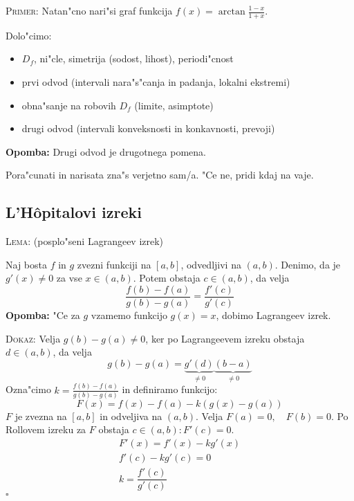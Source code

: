 \textsc{Primer:} Natan"cno nari"si graf funkcija $f(x) = \arctan \frac{1 - x}{1 + x}$.

Dolo"cimo:
\begin{itemize}
	\item $D_f$, ni"cle, simetrija (sodost, lihost), periodi"cnost
	\item prvi odvod (intervali nara"s"canja in padanja, lokalni ekstremi)
	\item obna"sanje na robovih $D_f$ (limite, asimptote)
	\item drugi odvod (intervali konveksnosti in konkavnosti, prevoji)
\end{itemize}
\textbf{Opomba:} Drugi odvod je drugotnega pomena.

Pora"cunati in narisata zna"s verjetno sam/a. "Ce ne, pridi kdaj na vaje.
%
\subsection{L'H\^{o}pitalovi izreki}
\textsc{Lema:} (posplo"seni Lagrangeev izrek)

Naj bosta $f$ in $g$ zvezni funkciji na $[a, b]$, odvedljivi na $(a, b)$. Denimo, da je $g'(x) \neq 0$ za vse $x \in (a, b)$. Potem obstaja $c \in (a, b)$, da velja
\begin{equation*}
\dfrac{f(b) - f(a)}{g(b) - g(a)} = \dfrac{f'(c)}{g'(c)}
\end{equation*}
\textbf{Opomba:} "Ce za $g$ vzamemo funkcijo $g(x) = x$, dobimo Lagrangeev izrek.

\textsc{Dokaz:} Velja $g(b) - g(a) \neq 0$, ker po Lagrangeevem izreku obstaja $d \in (a, b)$, da velja
\begin{equation*}
g(b) - g(a) = \underbrace{g'(d)}_{\neq 0} \underbrace{(b-a)}_{\neq 0}
\end{equation*}
Ozna"cimo $k = \frac{f(b) - f(a)}{g(b) - g(a)}$ in definiramo funkcijo:
\begin{equation*}
F(x) = f(x) - f(a) - k(g(x) - g(a))
\end{equation*}
$F$ je zvezna na $[a, b]$ in odveljiva na $(a, b)$. Velja $F(a) = 0, \quad F(b) = 0$. Po Rollovem izreku za $F$ obstaja $c \in (a, b): F'(c) = 0$.
\begin{gather*}
F'(x) = f'(x) - kg'(x) \\
f'(c) - kg'(c) = 0 \\
k = \dfrac{f'(c)}{g'(c)}
\end{gather*}
\hfill $\square$

